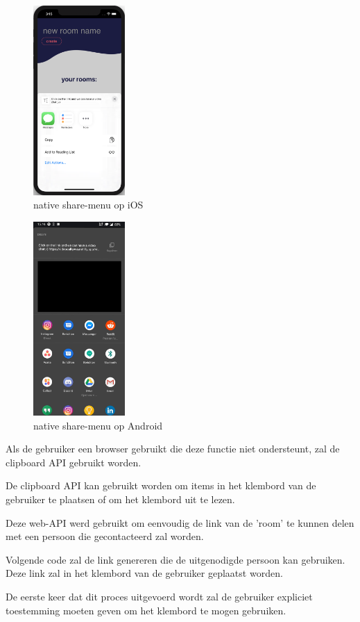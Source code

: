 		\begin{figure}[H]
			\centering
			\includegraphics[width=35mm]{./img/share-iOS}{}
			\caption{native share-menu op iOS}
		\end{figure}	
		\begin{figure}[H]
			\centering
			\includegraphics[width=35mm]{./img/share-android.jpg}{}
			\caption{native share-menu op Android}
		\end{figure}

		Als de gebruiker een browser gebruikt die deze functie niet ondersteunt, zal de clipboard API gebruikt worden.
	
		De clipboard API kan gebruikt worden om items in het klembord van de gebruiker te plaatsen of om het klembord uit te lezen.
		
		Deze web-API werd gebruikt om eenvoudig de link van de 'room' te kunnen delen met een persoon die gecontacteerd zal worden.
		
		Volgende code zal de link genereren die de uitgenodigde persoon kan gebruiken. Deze link zal in het klembord van de gebruiker geplaatst worden.
		
		De eerste keer dat dit proces uitgevoerd wordt zal de gebruiker expliciet toestemming moeten geven om het klembord te mogen gebruiken.

